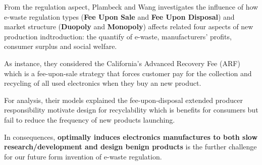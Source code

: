 From the regulation aspect, Plambeck and Wang  \cite{plambeck2009effects}  investigates the influence of how e-waste 
regulation types (\textbf{Fee Upon Sale} and \textbf{Fee Upon Disposal}) and market structure (\textbf{Duopoly} and \textbf{Monopoly}) 
affects related four aspects of new production indtroduction: the quantify of e-waste, manufacturers' profits, consumer surplus and social welfare. 

As instance, they considered the California's Advanced Recovery Fee (ARF) which is a fee-upon-sale strategy that forces 
customer pay for the collection and recycling of all used electronics when they buy an new product. 

For analysis, their models explained the fee-upon-disposal extended producer responsibility motivate design for 
recyclability which is benefits for consumers but fail to reduce the frequency of new products launching.

In consequences, \textbf{optimally induces electronics manufactures to both slow research/development and design benign 
products} is the further challenge for our future form invention of e-waste regulation.